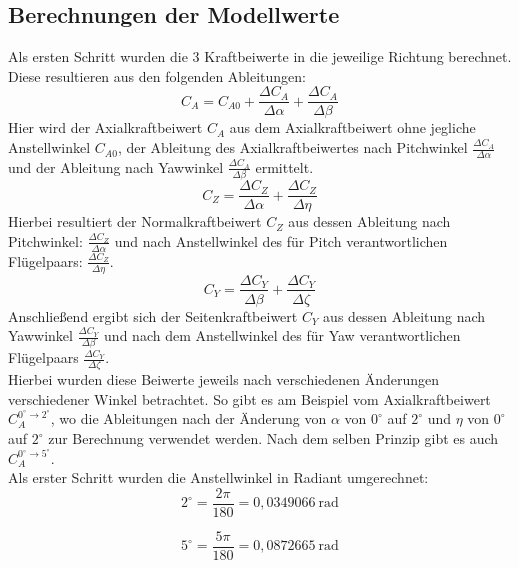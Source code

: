 \subsection{Berechnungen der Modellwerte}
\label{subsec:derivatives_calculation}
Als ersten Schritt wurden die 3 Kraftbeiwerte in die jeweilige Richtung berechnet. Diese resultieren aus den folgenden Ableitungen:
\begin{equation}
    C_A = C_{A0} + \frac{\Delta C_A}{\Delta \alpha} + \frac{\Delta C_A}{\Delta \beta}
\end{equation}
Hier wird der Axialkraftbeiwert $C_A$ aus dem Axialkraftbeiwert ohne jegliche Anstellwinkel $C_{A0}$, der Ableitung des Axialkraftbeiwertes nach Pitchwinkel $\frac{\Delta C_A}{\Delta \alpha}$ und der Ableitung nach Yawwinkel $\frac{\Delta C_A}{\Delta \beta}$ ermittelt.
\begin{equation}
    C_Z = \frac{\Delta C_Z}{\Delta \alpha} + \frac{\Delta C_Z}{\Delta \eta}
\end{equation}
Hierbei resultiert der Normalkraftbeiwert $C_Z$ aus dessen Ableitung nach Pitchwinkel: $\frac{\Delta C_Z}{\Delta \alpha}$ und nach Anstellwinkel des für Pitch verantwortlichen Flügelpaars: $\frac{\Delta C_Z}{\Delta \eta}$.
\begin{equation}
    C_Y = \frac{\Delta C_Y}{\Delta \beta} + \frac{\Delta C_Y}{\Delta \zeta}
\end{equation}
Anschließend ergibt sich der Seitenkraftbeiwert $C_Y$ aus dessen Ableitung nach Yawwinkel $\frac{\Delta C_Y}{\Delta \beta}$ und nach dem Anstellwinkel des für Yaw verantwortlichen Flügelpaars $\frac{\Delta C_Y}{\Delta \zeta}$.
\\
Hierbei wurden diese Beiwerte jeweils nach verschiedenen Änderungen verschiedener Winkel betrachtet. So gibt es am Beispiel vom Axialkraftbeiwert $C_A^{0^\circ \to 2^\circ}$, wo die Ableitungen nach der Änderung von $\alpha$ von $0^\circ$ auf $2^\circ$ und $\eta$ von $0^\circ$ auf $2^\circ$ zur Berechnung verwendet werden. Nach dem selben Prinzip gibt es auch $C_A^{0^\circ \to 5^\circ}$.
\\
Als erster Schritt wurden die Anstellwinkel in Radiant umgerechnet:
\begin{equation}
    2^\circ = \frac{2\pi}{180} = 0{,}0349066\ \mathrm{rad}
\end{equation}
    
\begin{equation}
    5^\circ = \frac{5\pi}{180} = 0{,}0872665\ \mathrm{rad}
\end{equation}


